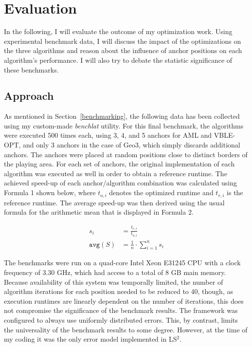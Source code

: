 \section{Evaluation}
\label{Evaluation}

In the following, I will evaluate the outcome of my optimization work. Using experimental benchmark data, I will discuss the impact of the optimizations on the three algorithms and reason about the influence of anchor positions on each algorithm's performance. I will also try to debate the statistic significance of these benchmarks.

\subsection{Approach}
As mentioned in Section~\ref{benchmarking}, the following data has been collected using my custom-made \emph{benchlat} utility. For this final benchmark, the algorithms were executed 500 times each, using 3, 4, and 5 anchors for AML and VBLE-OPT, and only 3 anchors in the case of Geo3, which simply discards additional anchors. The anchors were placed at random positions close to distinct borders of the playing area. For each set of anchors, the original implementation of each algorithm was executed as well in order to obtain a reference runtime. The achieved speed-up of each anchor/algorithm combination was calculated using Formula 1 shown below, where $t_{o,i}$ denotes the optimized runtime and $t_{r,i}$ is the reference runtime. The average speed-up was then derived using the usual formula for the arithmetic mean that is displayed in Formula 2.

\begin{align}
s_{i}& = \frac{t_{r,i}}{t_{o,i}} \\
\texttt{avg}(S)& = \frac{1}{n} \cdot \sum_{i = 1}^n s_{i}
\end{align}

The benchmarks were run on a quad-core Intel Xeon E31245 CPU with a clock frequency of 3.30 GHz, which had access to a total of 8 GB main memory. Because availability of this system was temporally limited, the number of algorithm iterations for each position needed to be reduced to 40, though, as execution runtimes are linearly dependent on the number of iterations, this does not compromise the significance of the benchmark results. The framework was configured to always use uniformly distributed errors. This, by contrast, limits the universality of the benchmark results to some degree. However, at the time of my coding it was the only error model implemented in LS$^{2}$.

